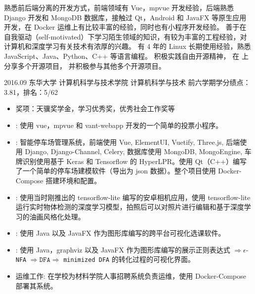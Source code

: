 \documentclass[zh]{resume}
\begin{document}
\makeheader

{\onehalfspacing\hspace{2em}%
熟悉前后端分离的开发方式，前端领域有 Vue，mpvue 开发经验，后端熟悉 Django 开发和 MongoDB 数据库，接触过 Qt，Android 和 JavaFX 等原生应用开发，在 Docker 运维上有比较丰富的经验，同时也有小程序开发经验。
善于在自我驱动（self-motivated）下学习陌生领域的知识，有较为丰富的工程经验，对计算机和深度学习有关技术有浓厚的兴趣。
有 4 年的 Linux 长期使用经验，熟悉 JavaScript、Java、Python、C++ 等语言编程。
积极实践自由开源精神，
在  上分享多个开源项目，
并积极参与其他多个开源项目。
\par}

\begin{educations}
	\education%
	{2016.09}%
	{东华大学}%
	{计算机科学与技术学院}%
	{计算机科学与技术}%
	{前六学期学分绩点：3.81，排名：5/62}%
\end{educations}
\begin{itemize}
	\item 奖项：天骥奖学金，学习优秀奖，优秀社会工作奖等%
\end{itemize}

\begin{itemize}
	\item {}: 使用 vue，mpvue 和 vant-webapp 开发的一个简单的投票小程序。
	\item {}:
	智能停车场管理系统，前端使用 Vue, ElementUI, Vuetify, Three.js, 后端使用 Django, Django-Channel, Celery, 数据库使用 MongoDB, MongoEngine, 车牌识别使用基于 Keras 和 Tensorflow 的 HyperLPR。使用 Qt（C++）编写了一个简单的停车场建模软件（导出为 json 数据）。整个项目使用 Docker-Compose 搭建环境和配置。
	\item {}: 使用当时刚推出的 tensorflow-lite 编写的安卓相机应用，使用 tensorflow-lite 运行实时物体检测的深度学习模型，拍照后可以对照片进行编辑和基于深度学习的油画风格化处理。
	\item {}: 使用 Java 以及 JavaFX 作为图形库编写的跨平台可视化选课软件。
	\item {}: 使用 Java，graphviz 以及 JavaFX 作为图形库编写的展示正则表达式 $\Rightarrow \epsilon$-\texttt{NFA} $\Rightarrow \texttt{DFA} \Rightarrow$ \texttt{minimized DFA} 的转化过程的可视化界面。
	\item 运维工作: 在学校为材料学院人事招聘系统负责运维，使用 Docker-Compose 部署其系统。
\end{itemize}
\end{document}

